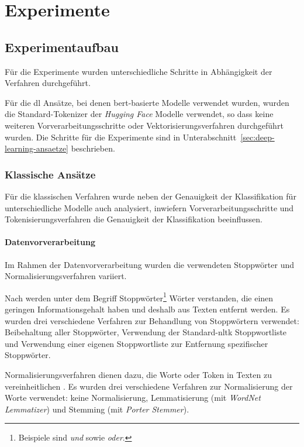 \section{Experimente}

\subsection{Experimentaufbau}

Für die Experimente wurden unterschiedliche Schritte in Abhängigkeit der Verfahren durchgeführt.

Für die \gls{dl} Ansätze, bei denen \gls{bert}-basierte Modelle verwendet wurden, wurden die Standard-Tokenizer der \textit{Hugging Face} Modelle verwendet, so dass keine weiteren Vorverarbeitungsschritte oder Vektorisierungsverfahren durchgeführt wurden.
Die Schritte für die Experimente sind in Unterabschnitt~\ref{sec:deep-learning-ansaetze} beschrieben.

\subsubsection{Klassische Ansätze}\label{sec:klassische-ansaetze}

Für die klassischen Verfahren wurde neben der Genauigkeit der Klassifikation für unterschiedliche Modelle auch analysiert, inwiefern Vorverarbeitungsschritte und Tokeni\-sie\-rungs\-verfahren die Genauigkeit der Klassifikation beeinflussen.

\paragraph{Datenvorverarbeitung}
Im Rahmen der Datenvorverarbeitung wurden die verwendeten Stoppwörter und Normalisierungsverfahren variiert.

Nach \cite[S.27]{manning2009introduction} werden unter dem Begriff Stoppwörter\footnote{Beispiele sind \textit{und} sowie \textit{oder}.} Wörter verstanden, die einen geringen Informationsgehalt haben und deshalb aus Texten entfernt werden.
Es wurden drei verschiedene Verfahren zur Behandlung von Stoppwörtern verwendet: Beibehaltung aller Stoppwörter, Verwendung der Standard-\gls{nltk} Stoppwortliste und Verwendung einer eigenen Stoppwortliste zur Entfernung spezifischer Stoppwörter.

Normalisierungsverfahren dienen dazu, die Worte oder Token in Texten zu vereinheitlichen \cite[S.28]{manning2009introduction}.
Es wurden drei verschiedene Verfahren zur Normalisierung der Worte verwendet: keine Normalisierung, Lemmatisierung (mit \textit{WordNet Lemmatizer}) und Stemming (mit \textit{Porter Stemmer}).

